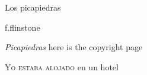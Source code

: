 \documentclass[14pt]{memoir}
\begin{document}
\pagestyle{empty}
\begin{center}
\huge{Los picapiedras}

\vspace{1in}
f.flinstone
\end{center}
\clearpage
\textit{Picapiedras}
here is the copyright page
\clearpage

\frontmatter

\pagestyle{plain}
\mainmatter

\lettrine{Y}{o estaba alojado} en un hotel 
\end{document}
